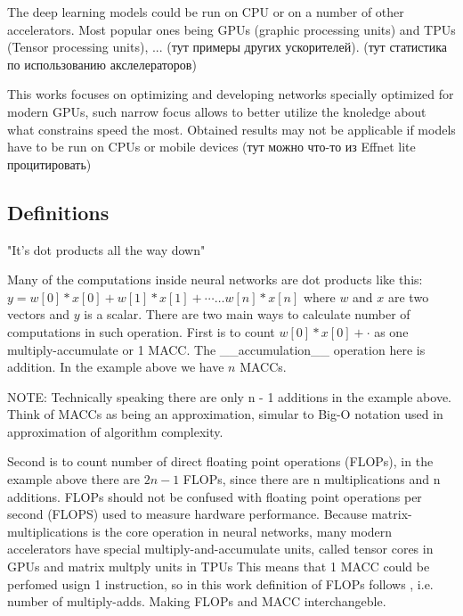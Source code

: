 The deep learning models could be run on CPU or on a number of other accelerators. Most popular ones being GPUs (graphic processing units) and TPUs (Tensor processing units), ... (тут примеры других ускорителей). (тут статистика по использованию акслелераторов)

This works focuses on optimizing and developing networks specially optimized for modern GPUs, such narrow focus allows to better utilize the knoledge about what constrains speed the most. Obtained results may not be applicable if models have to be run on CPUs or mobile devices (тут можно что-то из Effnet lite процитировать)


\subsection{Definitions}

"It’s dot products all the way down" 

Many of the computations inside neural networks are dot products like this: $y = w[0]*x[0] + w[1]*x[1] + \cdots \ldots w[n] * x[n]$ where $w$ and $x$ are two vectors and $y$ is a scalar. There are two main ways to calculate number of computations in such operation. First is to count $ w[0] * x[0] + \cdot $ as one multiply-accumulate or 1 MACC. The __accumulation__ operation here is addition. In the example above we have $n$ MACCs. 


NOTE: 
Technically speaking there are only n - 1 additions in the example above. Think of MACCs as being an approximation, simular to Big-O notation used in approximation of algorithm complexity.

Second is to count number of direct floating point operations (FLOPs), in the example above there are $2n - 1$ FLOPs, since there are n multiplications and n additions. FLOPs should not be confused with floating point operations per second (FLOPS) used to measure hardware performance. Because matrix-multiplications is the core operation in neural networks, many modern accelerators have special multiply-and-accumulate units, called tensor cores 
in GPUs and matrix multply units in TPUs %
This means that 1 MACC could be perfomed usign 1 instruction, so in this work definition of FLOPs follows \cite{zhang2018shufflenet}, i.e. number of multiply-adds. Making FLOPs and MACC interchangeble.




